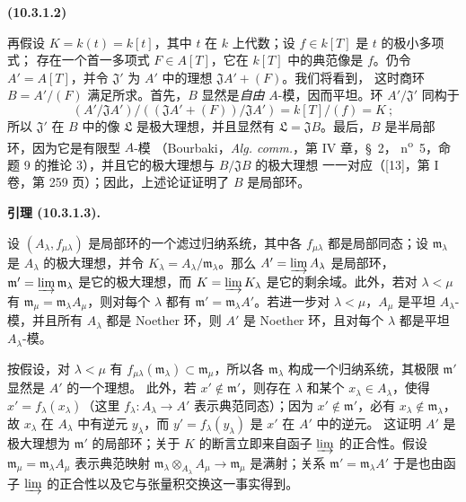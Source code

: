 \documentclass[UTF8,fontset=none,11pt,oneside,openany]{ctexbook}
\newenvironment{env}[1][]{%
  \par\medskip\noindent\textbf{(#1)}\ %
}{\par}
\newenvironment{lemma}[1][]{%
  \par\medskip\noindent\textbf{引理 (#1).}\ %
}{\par}
\let\EGAOriginalLabel\label
\renewcommand{\label}[1]{\phantomsection\EGAOriginalLabel{#1}}
\begin{document}
\begin{env}[10.3.1.2]
\label{0.10.3.1.2-fr}
再假设 $K=k(t)=k[t]$，其中 $t$ 在 $k$ 上代数；设 $f\in k[T]$ 是 $t$ 的极小多项式；
存在一个首一多项式 $F\in A[T]$，它在 $k[T]$ 中的典范像是 $f$。仍令
$A'=A[T]$，并令 $\mathfrak J'$ 为 $A'$ 中的理想 $\mathfrak J A'+(F)$。我们将看到，
这时商环 $B=A'/(F)$ 满足所求。首先，$B$ 显然是\emph{自由} $A$-模，因而平坦。环
$A'/\mathfrak J'$ 同构于
\[
  (A'/\mathfrak J A')/((\mathfrak J A'+(F))/\mathfrak J A')
  =k[T]/(f)=K~;
\]
所以 $\mathfrak J'$ 在 $B$ 中的像 $\mathfrak L$ 是极大理想，并且显然有
$\mathfrak L=\mathfrak J B$。最后，$B$ 是半局部环，因为它是有限型 $A$-模
（Bourbaki，\emph{Alg. comm.}，第 IV 章，\S~2，
n\textsuperscript{o}~5，命题 9 的推论 3），并且它的极大理想与 $B/\mathfrak J B$ 的极大理想
一一对应（[13]，第 I 卷，第 259 页）；因此，上述论证证明了 $B$ 是局部环。
\end{env}

\begin{lemma}[10.3.1.3]
\label{0.10.3.1.3-fr}
设 $(A_\lambda,f_{\mu\lambda})$ 是局部环的一个滤过归纳系统，其中各
$f_{\mu\lambda}$ 都是局部同态；设 $\mathfrak m_\lambda$ 是 $A_\lambda$ 的极大理想，并令
$K_\lambda=A_\lambda/\mathfrak m_\lambda$。那么 $A'=\varinjlim A_\lambda$ 是局部环，
$\mathfrak m'=\varinjlim\mathfrak m_\lambda$ 是它的极大理想，而
$K=\varinjlim K_\lambda$ 是它的剩余域。此外，若对 $\lambda<\mu$ 有
$\mathfrak m_\mu=\mathfrak m_\lambda A_\mu$，则对每个 $\lambda$ 都有
$\mathfrak m'=\mathfrak m_\lambda A'$。若进一步对 $\lambda<\mu$，$A_\mu$ 是平坦
$A_\lambda$-模，并且所有 $A_\lambda$ 都是 Noether 环，则 $A'$ 是 Noether 环，且对每个
$\lambda$ 都是平坦 $A_\lambda$-模。
\end{lemma}

按假设，对 $\lambda<\mu$ 有
$f_{\mu\lambda}(\mathfrak m_\lambda)\subset\mathfrak m_\mu$，所以各
$\mathfrak m_\lambda$ 构成一个归纳系统，其极限 $\mathfrak m'$ 显然是 $A'$ 的一个理想。
此外，若 $x'\notin\mathfrak m'$，则存在 $\lambda$ 和某个 $x_\lambda\in A_\lambda$，使得
$x'=f_\lambda(x_\lambda)$（这里 $f_\lambda:A_\lambda\to A'$ 表示典范同态）；因为
$x'\notin\mathfrak m'$，必有 $x_\lambda\notin\mathfrak m_\lambda$，故 $x_\lambda$ 在
$A_\lambda$ 中有逆元 $y_\lambda$，而 $y'=f_\lambda(y_\lambda)$ 是 $x'$ 在 $A'$ 中的逆元。
这证明 $A'$ 是极大理想为 $\mathfrak m'$ 的局部环；关于 $K$ 的断言立即来自函子
$\varinjlim$ 的正合性。假设 $\mathfrak m_\mu=\mathfrak m_\lambda A_\mu$ 表示典范映射
$\mathfrak m_\lambda\otimes_{A_\lambda}A_\mu\to\mathfrak m_\mu$ 是满射；关系
$\mathfrak m'=\mathfrak m_\lambda A'$ 于是也由函子 $\varinjlim$ 的正合性以及它与张量积交换这一事实得到。
\end{document}
